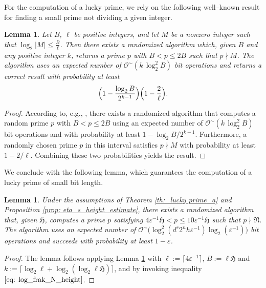 \documentclass[pdflatex,sn-basic]{sn-jnl}%
\theoremstyle{thmstyleone}%
\theoremstyle{thmstyletwo}%
\theoremstyle{thmstylethree}%
\newtheorem{lemma}[theorem]{Lemma}
\theoremstyle{definition}
\numberwithin{equation}{section}
\newcommand{\SO}{\mathcal{O}^{\sim}}
\begin{document}
For the computation of a lucky prime, we rely on the following
well--known result for finding a small prime not dividing
a given integer.
%
\begin{lemma}\label{lemma: finding_primes}
Let $B$, $\ell$ be positive integers, and let $M$ be a nonzero
integer such that $\log_2 |M|\leq \frac{B}{\ell}$. Then there exists
a randomized algorithm which, given $B$ and any positive integer
$k$, returns a prime $p$ with $B< p\le 2B$ such that $p\nmid M$. The
algorithm uses an expected number of $\mathcal{O}^\sim(k\,\log_2^2
B)$ bit operations and returns a correct result with probability at
least
\[
\Bigl(1-\frac{\log_2 B}{2^{k-1}}\Bigr)\Bigl(1-\frac{2}{\ell}\Bigr).
\]
\end{lemma}
%
\begin{proof}
According to, e.g.,  \cite[Theorem 18.8]{GaGe99}, there exists a
randomized algorithm that computes a random prime $p$ with $B<p\le
2B$ using an expected number of $\mathcal{O}^\sim(k\,\log_2^2 B)$
bit operations and with probability at least $1-{\log_2
B}/{2^{k-1}}$. Furthermore, a randomly chosen prime $p$ in this
interval satisfies $p\nmid M$ with probability at least
$1-{2}/{\ell}$. Combining these two probabilities yields the result.
\end{proof}
%
We conclude with the following lemma, which guarantees the computation of
a lucky prime of small bit length.
%
\begin{lemma} \label{lemma: computation_of_a_lucky_prime}
Under the assumptions of Theorem \ref{th:_lucky prime_a} and
Proposition \ref{prop: eta_s_height_estimate}, there exists a
randomized algorithm that, given $\mathfrak{H}$, computes a prime
$p$ satisfying $4\varepsilon^{-1}\mathfrak{H} < p \leq
10\varepsilon^{-1}\mathfrak{H}$ such that $p \nmid \mathfrak{N}$.
The algorithm uses an expected number of $\SO \bigr(\log_2^2 (d^r
2^nh\varepsilon^{-1})\log_2(\varepsilon^{-1})\bigl)$ bit operations
and succeeds with probability at least $1-\varepsilon$.
\end{lemma}
%
\begin{proof}
The lemma follows applying Lemma \ref{lemma: finding_primes} with
$\ell:=\lceil 4\varepsilon^{-1}\rceil$, $B:=\ell\mathfrak{H}$ and
$k:=\lceil \log_2\ell + \log_2(\log_2\ell\mathfrak{H})\rceil$, and
by invoking inequality $\eqref{eq: log_frak_N_height}$.
\end{proof}
%
%
\end{document}
